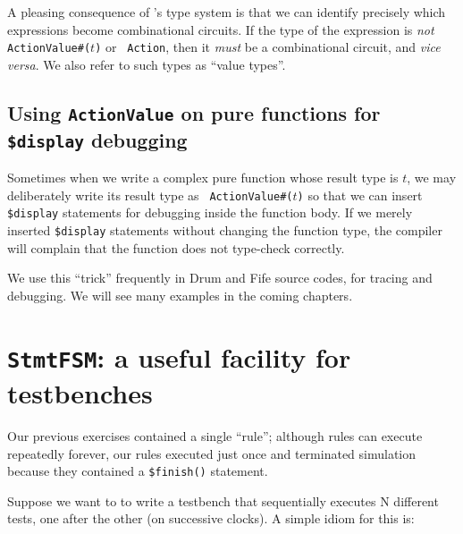 
A pleasing consequence of {\BSV}'s type system is that we can identify
precisely which expressions become combinational circuits.  If the
type of the expression is \emph{not} {\tt ActionValue\#($t$)} or {\tt
Action}, then it \emph{must} be a combinational circuit, and
\emph{vice versa}.  We also refer to such types as ``value types''.


\subsection{Using {\tt ActionValue} on pure functions for {\tt \$display} debugging}

Sometimes when we write a complex pure function whose result type is
$t$, we may deliberately write its result type as {\tt
ActionValue\#($t$)} so that we can insert \verb|$display| statements
for debugging inside the function body.  If we merely inserted
\verb|$display| statements without changing the function type, the
compiler will complain that the function does not type-check
correctly.

We use this ``trick'' frequently in Drum and Fife source codes, for
tracing and debugging.  We will see many examples in the coming
chapters.


\section{{\tt StmtFSM}: a useful facility for testbenches}

\label{BSV_small_testbench}


Our previous exercises contained a single ``rule''; although rules can
execute repeatedly forever, our rules executed just once and
terminated simulation because they contained a \verb|$finish()|
statement.

Suppose we want to to write a testbench that sequentially executes N
different tests, one after the other (on successive clocks).  A simple
idiom for this is:

